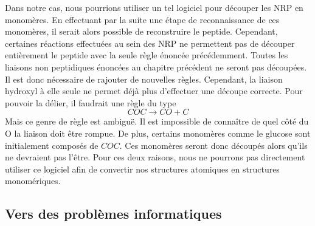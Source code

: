 Dans notre cas, nous pourrions utiliser un tel logiciel pour découper les NRP en monomères.
En effectuant par la suite une étape de reconnaissance de ces monomères, il serait alors possible de reconstruire le peptide.
Cependant, certaines réactions effectuées au sein des NRP ne permettent pas de découper entièrement le peptide avec la seule règle énoncée précédemment.
Toutes les liaisons non peptidiques énoncées au chapitre précédent ne seront pas découpées.
Il est donc nécessaire de rajouter de nouvelles règles.
Cependant, la liaison hydroxyl à elle seule ne permet déjà plus d'effectuer une découpe correcte.
Pour pouvoir la délier, il faudrait une règle du type
\begin{equation}
  COC \longrightarrow CO + C
\end{equation}
Mais ce genre de règle est ambiguë.
Il est impossible de connaître de quel côté du O la liaison doit être rompue.
De plus, certains monomères comme le glucose sont initialement composés de $COC$.
Ces monomères seront donc découpés alors qu'ils ne devraient pas l'être.
Pour ces deux raisons, nous ne pourrons pas directement utiliser ce logiciel afin de convertir nos structures atomiques en structures monomériques.
% 
% 
% 




\subsection{Vers des problèmes informatiques}

